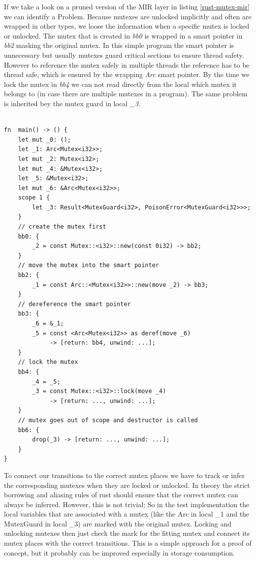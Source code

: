 If we take a look on a pruned version of the MIR layer in listing \ref{rust-mutex-mir} we can identify a Problem.
Because mutexes are unlocked implicitly and often are wrapped in other types, we loose the information when a specific mutex is locked or unlocked.
The mutex that is created in \textit{bb0} is wrapped in a smart pointer in \textit{bb2} masking the original mutex.
In this simple program the smart pointer is unnecessary but usually mutexes guard critical sections to ensure thread safety.
However to reference the mutex safely in multiple threads the reference has to be thread safe, which is ensured by the wrapping \textit{Arc} smart pointer.
By the time we lock the mutex in \textit{bb4} we can not read directly from the local which mutex it belongs to (in case there are multiple mutexes in a program).
The same problem is inherited bey the mutex guard in local \textit{\_3}.

\begin{lstlisting}

fn  main() -> () {
    let mut _0: ();
    let _1: Arc<Mutex<i32>>;
    let mut _2: Mutex<i32>;
    let mut _4: &Mutex<i32>;
    let _5: &Mutex<i32>;
    let mut _6: &Arc<Mutex<i32>>;
    scope 1 {
        let _3: Result<MutexGuard<i32>, PoisonError<MutexGuard<i32>>>; 
    }
    // create the mutex first
    bb0: {
        _2 = const Mutex::<i32>::new(const 0i32) -> bb2; 
    }
    // move the mutex into the smart pointer
    bb2: {
        _1 = const Arc::<Mutex<i32>>::new(move _2) -> bb3; 
    }
    // dereference the smart pointer
    bb3: {
        _6 = &_1;                        
        _5 = const <Arc<Mutex<i32>> as deref(move _6) 
             -> [return: bb4, unwind: ...]; 
    }
    // lock the mutex
    bb4: {
        _4 = _5;                         
        _3 = const Mutex::<i32>::lock(move _4) 
             -> [return: ..., unwind: ...]; 
    }
    // mutex goes out of scope and destructor is called
    bb6: {
        drop(_3) -> [return: ..., unwind: ...];
    }
}
\end{lstlisting}

To connect our transitions to the correct mutex places we have to track or infer the corresponding mutexes when they are locked or unlocked.
In theory the strict borrowing and aliasing rules of rust should ensure that the correct mutex can always be inferred.
However, this is not trivial; So in the test implementation the local variables that are associated with a mutex (like the Arc in local \_1 and the MutexGuard in local \_3) are marked with the original mutex.
Locking and unlocking mutexes then just check the mark for the fitting mutex and connect its mutex places with the correct transitions.
This is a simple approach for a proof of concept, but it probably can be improved especially in storage consumption.


